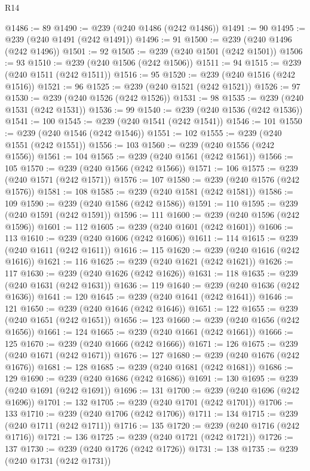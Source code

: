 \begin{lexlean}{R14}
\begin{coremodule}
@1486 := 89
@1490 := @239 (@240 @1486 (@242 @1486))
@1491 := 90
@1495 := @239 (@240 @1491 (@242 @1491))
@1496 := 91
@1500 := @239 (@240 @1496 (@242 @1496))
@1501 := 92
@1505 := @239 (@240 @1501 (@242 @1501))
@1506 := 93
@1510 := @239 (@240 @1506 (@242 @1506))
@1511 := 94
@1515 := @239 (@240 @1511 (@242 @1511))
@1516 := 95
@1520 := @239 (@240 @1516 (@242 @1516))
@1521 := 96
@1525 := @239 (@240 @1521 (@242 @1521))
@1526 := 97
@1530 := @239 (@240 @1526 (@242 @1526))
@1531 := 98
@1535 := @239 (@240 @1531 (@242 @1531))
@1536 := 99
@1540 := @239 (@240 @1536 (@242 @1536))
@1541 := 100
@1545 := @239 (@240 @1541 (@242 @1541))
@1546 := 101
@1550 := @239 (@240 @1546 (@242 @1546))
@1551 := 102
@1555 := @239 (@240 @1551 (@242 @1551))
@1556 := 103
@1560 := @239 (@240 @1556 (@242 @1556))
@1561 := 104
@1565 := @239 (@240 @1561 (@242 @1561))
@1566 := 105
@1570 := @239 (@240 @1566 (@242 @1566))
@1571 := 106
@1575 := @239 (@240 @1571 (@242 @1571))
@1576 := 107
@1580 := @239 (@240 @1576 (@242 @1576))
@1581 := 108
@1585 := @239 (@240 @1581 (@242 @1581))
@1586 := 109
@1590 := @239 (@240 @1586 (@242 @1586))
@1591 := 110
@1595 := @239 (@240 @1591 (@242 @1591))
@1596 := 111
@1600 := @239 (@240 @1596 (@242 @1596))
@1601 := 112
@1605 := @239 (@240 @1601 (@242 @1601))
@1606 := 113
@1610 := @239 (@240 @1606 (@242 @1606))
@1611 := 114
@1615 := @239 (@240 @1611 (@242 @1611))
@1616 := 115
@1620 := @239 (@240 @1616 (@242 @1616))
@1621 := 116
@1625 := @239 (@240 @1621 (@242 @1621))
@1626 := 117
@1630 := @239 (@240 @1626 (@242 @1626))
@1631 := 118
@1635 := @239 (@240 @1631 (@242 @1631))
@1636 := 119
@1640 := @239 (@240 @1636 (@242 @1636))
@1641 := 120
@1645 := @239 (@240 @1641 (@242 @1641))
@1646 := 121
@1650 := @239 (@240 @1646 (@242 @1646))
@1651 := 122
@1655 := @239 (@240 @1651 (@242 @1651))
@1656 := 123
@1660 := @239 (@240 @1656 (@242 @1656))
@1661 := 124
@1665 := @239 (@240 @1661 (@242 @1661))
@1666 := 125
@1670 := @239 (@240 @1666 (@242 @1666))
@1671 := 126
@1675 := @239 (@240 @1671 (@242 @1671))
@1676 := 127
@1680 := @239 (@240 @1676 (@242 @1676))
@1681 := 128
@1685 := @239 (@240 @1681 (@242 @1681))
@1686 := 129
@1690 := @239 (@240 @1686 (@242 @1686))
@1691 := 130
@1695 := @239 (@240 @1691 (@242 @1691))
@1696 := 131
@1700 := @239 (@240 @1696 (@242 @1696))
@1701 := 132
@1705 := @239 (@240 @1701 (@242 @1701))
@1706 := 133
@1710 := @239 (@240 @1706 (@242 @1706))
@1711 := 134
@1715 := @239 (@240 @1711 (@242 @1711))
@1716 := 135
@1720 := @239 (@240 @1716 (@242 @1716))
@1721 := 136
@1725 := @239 (@240 @1721 (@242 @1721))
@1726 := 137
@1730 := @239 (@240 @1726 (@242 @1726))
@1731 := 138
@1735 := @239 (@240 @1731 (@242 @1731))

\end{coremodule}
\end{lexlean}

